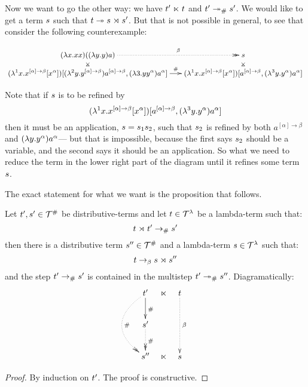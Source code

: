 \bigskip

Now we want to go the other way: we have $t' \mathrel{\ltimes} t$ and $t' \mathrel{\mathrel{\twoheadrightarrow}_{\mathtt{\#}}} s'$.
We would like to get a term $s$ such that $t \mathrel{\twoheadrightarrow} s \mathrel{\rtimes} s'$.
But that is not possible in general, to see that consider the following counterexample:

\[
  {\small
    \xymatrix@R=.25cm@C=.5cm{
      (\lam{\var}{\var \var}) ((\lam{\vartwo}{\vartwo}) a)
      \ar@{.>>}[r]^-{\beta}
      \ar@{}[d]|*=0[@]{\rtimes}
      &
      \tmtwo
      \ar@{}[d]|*=0[@]{\rtimes}
    \\
      (\lamp{1}{\var}{\var^{[\alpha] \to \beta} [\var^{\alpha}]})
          [(\lamp{2}{\vartwo}{\vartwo^{[\alpha] \to \beta}}) a^{[\alpha] \to \beta},
           (\lam{3}{\vartwo}{\vartwo^\alpha}) a^\alpha]
      \ar@{->}[r]^-{\dist}
      &
      (\lamp{1}{\var}{\var^{[\alpha] \to \beta} [\var^{\alpha}]})
          [a^{[\alpha] \to \beta},
           (\lamp{3}{\vartwo}{\vartwo^\alpha}) a^\alpha]
    }
  }
\]

Note that if $s$ is to be refined by
  \[(\lambda^{1} x. x^{[\alpha] \to \beta} [x^{\alpha}])
          [a^{[\alpha] \to \beta},
           (\lambda^{3} y. y^\alpha) a^\alpha]\]
then it must be an application, $s = s_1 s_2$, such that $s_2$
is refined by both $a^{[\alpha] \to \beta}$ and $(\lambda y. y^\alpha) a^\alpha$---
but that is impossible, because the first says $s_2$ should be a variable, and the second
says it should be an application.
So what we need to reduce the term in the lower right part of the diagram until
it refines some term $s$.

The exact statement for what we want is the proposition that follows.

\begin{proposition}
Let $t',s' \in \mathcal{T}^{\mathtt{\#}}$ be distributive-terms and let $t \in \mathcal{T}^{\lambda}$ be a lambda-term such that:
\[
  t \mathrel{\rtimes} t' \mathrel{\to_{\mathtt{\#}}} s'
\]
then there is a distributive term $s'' \in \mathcal{T}^{\mathtt{\#}}$ and a lambda-term $s \in \mathcal{T}^{\lambda}$ such that:
\[
  t \mathrel{\to_\beta} s \mathrel{\rtimes} s''
\]
and the step $t' \mathrel{\to_{\mathtt{\#}}} s'$ is contained in the multistep $t' \mathrel{\mathrel{\twoheadrightarrow}_{\mathtt{\#}}} s''$.
Diagramatically:
\[
\xymatrix@C=.25cm{
\tm' \ar[d]^{\dist} \ar@{.>>}@/_1cm/[dd]^{\dist} & \refines  & \tm    \ar@{.>}[dd]^{\beta} \\
\tmtwo' \ar@{.>>}[d]^{\dist}                     &            &                             \\
\tmtwo''                                         & \refines  & \tmtwo                      \\
}
\]
\end{proposition}
\begin{proof}
 By induction on $t'$. The proof is constructive.
\end{proof}

